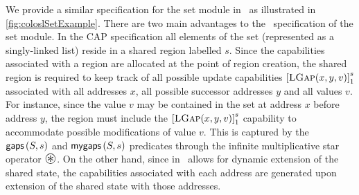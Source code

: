 We provide a similar specification for the set module in \colosl\ as illustrated in \fig\ref{fig:coloslSetExample}. There are two main advantages to the \colosl\ specification of the set module. In the CAP specification all elements of the set (represented as a singly-linked list) reside in a shared region labelled $s$. Since the capabilities associated with a region are allocated at the point of region creation, the shared region is required to keep track of all possible update capabilities $\left[\textsc{LGap}(x, y, v)\right]^{s}_{1}$ associated with all addresses $x$, all possible successor addresses $y$ and all values $v$. For instance, since the value $v$ may be contained in the set at address $x$ before address $y$, the region must include the $\left[\textsc{LGap}(x, y, v)\right]^{s}_{1}$ capability to accommodate possible modifications of value $v$. This is captured by the $\textsf{gaps}\left(S, s\right)$ and $\textsf{mygaps}\left(S, s\right)$ predicates through the infinite multiplicative star operator $\iterStar$. On the other hand, since in \colosl\ allows for dynamic extension of the shared state, the capabilities associated with each address are generated upon extension of the shared state with those addresses. 

